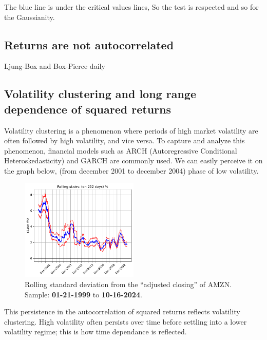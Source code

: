 \documentclass{article}
\begin{document}
\noindent The blue line is under the critical values lines, 
So the test is respected and so for the Gaussianity.
\subsection{Returns are not autocorrelated}
\begin{table}[h!]
    \centering
      
    \caption{Ljung-Box and Box-Pierce daily}
    \label{tab:LB_BP}
\end{table}
\subsection{Volatility clustering and long range dependence of squared returns}


Volatility clustering is a phenomenon where periods of high market volatility are often followed by high volatility, and vice versa. To capture and analyze this phenomenon, financial models such as ARCH (Autoregressive Conditional Heteroskedasticity) and GARCH are commonly used. We can easily perceive it on the graph below, (from december 2001 to december 2004) phase of low volatility.

\begin{figure}[H]
    \centering
    \includegraphics[width=0.5\textwidth]{Img/Fact7_AMZN_rolling_stdev.pdf}
    \caption{Rolling standard deviation from the “adjusted closing” of AMZN. Sample: \textbf{01-21-1999} to \textbf{10-16-2024}.}
    \label{fig:Rolling_std_dev_1}
\end{figure}

\noindent This persistence in the autocorrelation of squared returns reflects volatility clustering. 
High volatility often persists over time before settling into a lower volatility regime; 
this is how time dependance is reflected.
\end{document}
